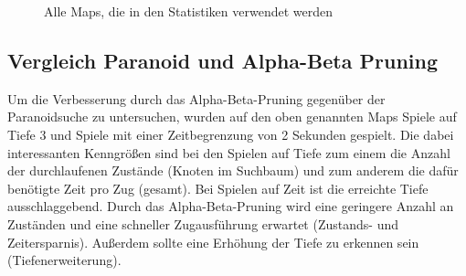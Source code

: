 \documentclass[12pt,a4paper,bibliography=totocnumbered,listof=totocnumbered]{scrartcl}
\begin{document}
\begin{figure}
		\qquad
		\qquad
		\qquad

		\caption{Alle Maps, die in den Statistiken verwendet werden}
		\label{fig:statistik_maps}
	\end{figure}
	
	\newpage
	
    \subsection{Vergleich Paranoid und Alpha-Beta Pruning}
    \vspace{1em} 
    
    Um die Verbesserung durch das Alpha-Beta-Pruning gegenüber der Paranoidsuche zu untersuchen, wurden auf den oben genannten Maps Spiele auf Tiefe 3 und Spiele mit einer Zeitbegrenzung von 2 Sekunden gespielt. Die dabei interessanten Kenngrößen sind bei den Spielen auf Tiefe zum einem die Anzahl der durchlaufenen Zustände (Knoten im Suchbaum) und zum anderem die dafür benötigte Zeit pro Zug (gesamt). Bei Spielen auf Zeit ist die erreichte Tiefe ausschlaggebend. Durch das Alpha-Beta-Pruning wird eine geringere Anzahl an Zuständen und eine schneller Zugausführung erwartet (Zustands- und Zeitersparnis). Außerdem sollte eine Erhöhung der Tiefe zu erkennen sein (Tiefenerweiterung).\newline
    
\end{document}
